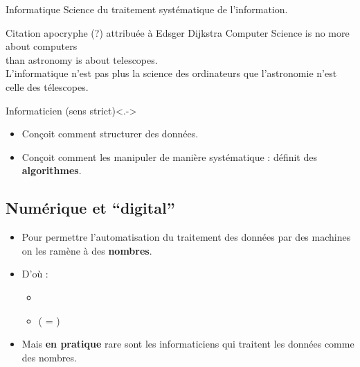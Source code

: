 \begin{slide}

	
	
	\begin{block}{Informatique}
	Science du traitement systématique de l'information.
	\end{block}
	
	
	\begin{exampleblock}{Citation apocryphe (?) attribuée à Edsger Dijkstra}%
	\centering
        Computer Science is no more about computers \\
        than astronomy is about telescopes.\\
	
        \medskip
	L'informatique n'est pas plus la science des ordinateurs que l'astronomie n'est celle des télescopes.
	\end{exampleblock}
	
\end{slide}

\begin{slide}
	\begin{block}{Informaticien (sens strict)}<.->
		\begin{itemize}
			\item Conçoit comment structurer des données.
			\item Conçoit comment les manipuler de manière systématique : définit des \textbf{algorithmes}.
		\end{itemize}
	\end{block}
\end{slide}
\subsection{Numérique et \enquote{digital}}

\begin{slide}

	\begin{itemize}
		\item Pour permettre l'automatisation du traitement des données par des machines on les ramène à des \textbf{nombres}.
		\item D'où :
			\begin{itemize}
				\item {}
				\item {} ( = )
			\end{itemize}
		\item Mais \textbf{en pratique} rare sont les informaticiens qui traitent les données comme des nombres. 
	\end{itemize}
\end{slide}

